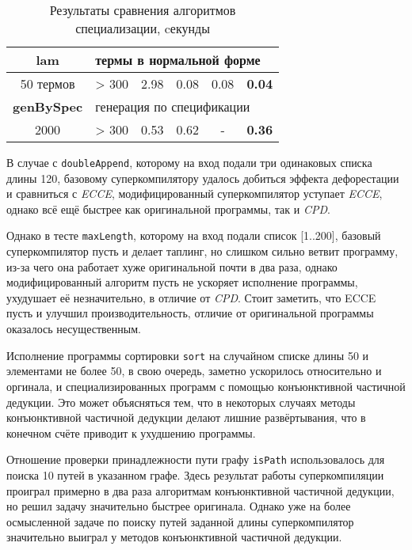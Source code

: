 \begin{table}[h!]
\begin{tabular}{|c|c|c|c|c|c|}
{\bf lam} & \multicolumn{5}{|l|}{термы в нормальной форме} \\ \hline
50 термов & > 300    & 2.98  & 0.08 & 0.08 & {\bf 0.04}   \\
\hline
{\bf genBySpec} & \multicolumn{5}{|l|}{генерация по спецификации} \\ \hline
2000            & > 300 & 0.53 & 0.62 & - & {\bf 0.36} \\ \hline
\end{tabular}
\caption{Результаты сравнения алгоритмов специализации, cекунды}
\label{fig:totalResult}
\end{table}

В случае с \lstinline{doubleAppend}, которому на вход подали три одинаковых списка длины 120,
базовому суперкомпилятору удалось
добиться эффекта дефорестации и сравниться с {\it ECCE}, модифицированный суперкомпилятор
уступает {\it ECCE}, однако всё ещё быстрее как оригинальной программы, так и {\it CPD}.

Однако в тесте \lstinline{maxLength}, которому на вход подали список [1..200], базовый суперкомпилятор пусть и делает
таплинг, но слишком сильно ветвит программу, из-за чего она работает хуже оригинальной
почти в два раза, однако модифицированный алгоритм пусть не ускоряет исполнение программы,
ухудушает её незначительно, в отличие от {\it CPD}. Стоит заметить, что ECCE пусть и
улучшил производительность, отличие от оригинальной программы оказалось несущественным.

Исполнение программы сортировки \lstinline{sort} на случайном списке длины 50 и элементами
не более 50, в свою очередь, заметно ускорилось относительно и оргинала, и специализированных
программ с помощью конъюнктивной частичной дедукции. Это может объясняться тем, что в некоторых
случаях методы конъюнктивной частичной дедукции делают лишние развёртывания, что в конечном
счёте приводит к ухудшению программы.

Отношение проверки принадлежности пути графу \lstinline{isPath} использовалось
для поиска 10 путей в указанном графе. Здесь результат работы суперкомпиляции
проиграл примерно в два раза алгоритмам конъюнктивной частичной дедукции,
но решил задачу значительно быстрее оригинала. Однако уже на более
осмысленной задаче по поиску путей заданной длины суперкомпилятор
значительно выиграл у методов конъюнктивной частичной дедукции.


